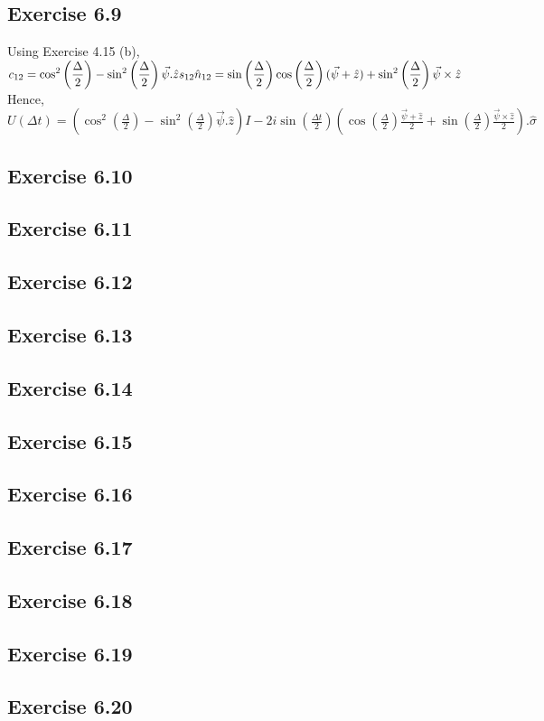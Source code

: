 \documentclass[a4paper,12pt]{article}
\begin{document}
\subsection*{Exercise 6.9}
Using Exercise 4.15 (b),\\
$\displaystyle c_{12}=\cos^2\left(\frac{\Delta}{2}\right)-\sin^2\left(\frac{\Delta}{2}\right)\vec{\psi}.\hat{z}\\
\displaystyle s_{12}\hat{n}_{12}=\sin\left(\frac{\Delta}{2}\right)\cos\left(\frac{\Delta}{2}\right)(\vec{\psi}+\hat{z})+
\sin^2\left(\frac{\Delta}{2}\right)\vec{\psi}\times\hat{z}$\\
Hence,\\
$\displaystyle U(\Delta t)=\left(\cos^2\left(\frac{\Delta}{2}\right)-\sin^2\left(\frac{\Delta}{2}\right)\vec{\psi}.\hat{z}\right)I-
2i\sin\left(\frac{\Delta t}{2}\right)\left(\cos\left(\frac{\Delta}{2}\right)\frac{\vec{\psi}+\hat{z}}{2}+
\sin\left(\frac{\Delta}{2}\right)\frac{\vec{\psi}\times\hat{z}}{2}\right).\hat{\sigma}$
\subsection*{Exercise 6.10}

\subsection*{Exercise 6.11}
\subsection*{Exercise 6.12}
\subsection*{Exercise 6.13}
\subsection*{Exercise 6.14}
\subsection*{Exercise 6.15}
\subsection*{Exercise 6.16}
\subsection*{Exercise 6.17}
\subsection*{Exercise 6.18}
\subsection*{Exercise 6.19}
\subsection*{Exercise 6.20}
\end{document}
